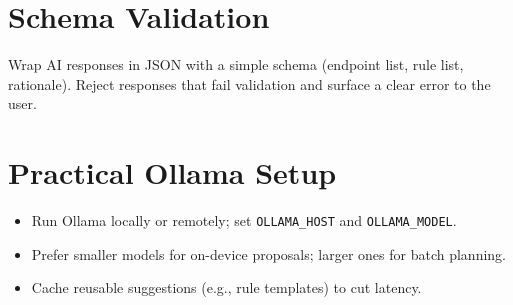 \section{Schema Validation}
Wrap AI responses in JSON with a simple schema (endpoint list, rule list, rationale). Reject responses that fail validation and surface a clear error to the user.

\section{Practical Ollama Setup}
\begin{itemize}
    \item Run Ollama locally or remotely; set \texttt{OLLAMA\_HOST} and \texttt{OLLAMA\_MODEL}.
    \item Prefer smaller models for on-device proposals; larger ones for batch planning.
    \item Cache reusable suggestions (e.g., rule templates) to cut latency.
\end{itemize}

